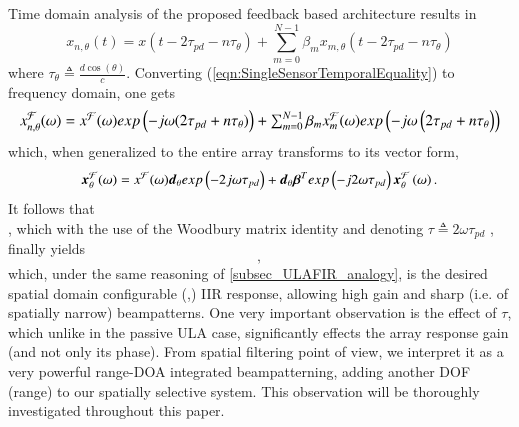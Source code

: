 Time domain analysis of the proposed feedback based architecture results in 
\begin{equation}
    \label{eqn:SingleSensorTemporalEquality}
    x_{n,\theta}(t) = x\left(t-2\tau_{pd}-n\tau_{\theta}\right)+\sum_{m=0}^{N-1}{\beta_{m}x_{m,\theta}(t-2\tau_{pd}-n\tau_{\theta})}
\end{equation}
where $\tau_{\theta} \triangleq \frac{d\cos\left(\theta\right)}{c}$.
Converting (\ref{eqn:SingleSensorTemporalEquality}) to frequency domain, one gets
\begin{equation}
\resizebox{\linewidth}{!}{%
        $
        x_{n,\theta}^{\mathcal{F}}(\omega) = 
        x^{\mathcal{F}}(\omega)
        exp\left(-j\omega(2\tau_{pd}+n\tau_{\theta})\right)
        +\sum_{m=0}^{N-1}
        {
        \beta_{m}x_{m}^{\mathcal{F}}(\omega)
        exp\left(-j\omega\left(2\tau_{pd}+n\tau_{\theta}\right)\right)
        } 
        $}
\end{equation} 
which, when generalized to the entire array transforms to its vector form,
\begin{equation}
\boldsymbol{x}^{\mathcal{F}}_{\theta}(\omega) = 
x^{\mathcal{F}}(\omega)\boldsymbol{d}_{\theta}exp\left(-2j\omega\tau_{pd}\right)
+
\boldsymbol{d}_{\theta}\boldsymbol{\beta}^{T}exp\left(-j2\omega\tau_{pd}\right)\boldsymbol{x}_{\theta}^{\mathcal{F}}\left(\omega\right).
\end{equation}
It follows that
$$

$$
, which with the use of the Woodbury matrix identity and denoting $\tau\triangleq2\omega\tau_{pd}$ \cite{woodbury1950inverting}, finally yields
\begin{equation}
\label{eqn:GeneralFeedbackTransferFunction}
,
\end{equation}
which, under the same reasoning of \ref{subsec_ULAFIR_analogy}, is the desired spatial domain configurable (\vecnot{\alpha},\vecnot{\beta}) IIR response, allowing high gain and sharp (i.e. of spatially narrow) beampatterns.
One very important observation is the effect of $\tau$, which unlike in the passive ULA case, significantly effects the array response gain (and not only its phase).
From spatial filtering point of view, we interpret it as a very powerful range-DOA integrated beampatterning, adding another DOF (range) to our spatially selective system.
This observation will be thoroughly investigated throughout this paper.